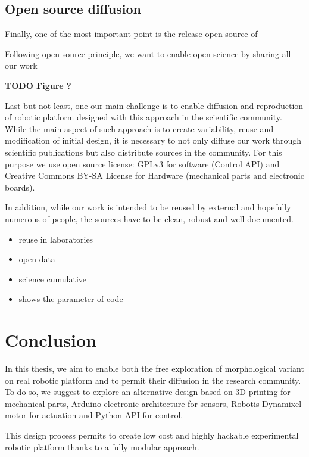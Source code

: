 \subsection{Open source diffusion} %

Finally, one of the most important point is the release open source of

Following open source principle, we want to enable open science by sharing all our work


\textbf{TODO Figure ?}

Last but not least, one our main challenge is to enable diffusion and reproduction of robotic platform designed with this approach in the scientific community. While the main aspect of such approach is to create variability, reuse and modification of initial design, it is necessary to not only diffuse our work through scientific publications but also distribute sources in the community. For this purpose we use open source license: GPLv3 for software (Control API) and Creative Commons BY-SA License for Hardware (mechanical parts and electronic boards).

In addition, while our work is intended to be reused by external and hopefully numerous of people, the sources have to be clean, robust and well-documented.


\begin{itemize}
    \item reuse in laboratories
    \item open data
    \item science cumulative
    \item shows the parameter of code
\end{itemize}


\section{Conclusion} %

In this thesis, we aim to enable both the free exploration of morphological variant on real robotic platform and to permit their diffusion in the research community. To do so, we suggest to explore an alternative design based on 3D printing for mechanical parts, Arduino electronic architecture for sensors, Robotis Dynamixel motor for actuation and Python API for control.

This design process permits to create low cost and highly hackable experimental robotic platform thanks to a fully modular approach.

